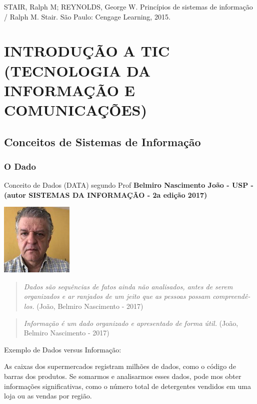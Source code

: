 \documentclass[
]{book}
\begin{document}
STAIR, Ralph M; REYNOLDS, George W. Princípios de sistemas de informação / Ralph M. Stair. São Paulo: Cengage Learning, 2015.

\chapter{INTRODUÇÃO A TIC (TECNOLOGIA DA INFORMAÇÃO E COMUNICAÇÕES)}\label{introduuxe7uxe3o-a-tic-tecnologia-da-informauxe7uxe3o-e-comunicauxe7uxf5es}

\section{Conceitos de Sistemas de Informação}\label{conceitos-de-sistemas-de-informauxe7uxe3o}

\subsection{O Dado}\label{o-dado}

Conceito de Dados (DATA) segundo Prof \textbf{Belmiro Nascimento João - USP - (autor SISTEMAS DA INFORMAÇÃO - 2a edição 2017)}

\includegraphics[width=1.36458in,height=\textheight]{images/belmiro_do_nascimento_joao-2.jpg}

\begin{quote}
\emph{Dados são sequências de fatos ainda não analisados, antes de serem organizados e ar­ ranjados de um jeito que as pessoas possam compreendê-los.} (João, Belmiro Nascimento - 2017)
\end{quote}

\begin{quote}
\emph{Informação é um dado organizado e apresentado de forma útil.} (João, Belmiro Nascimento - 2017)
\end{quote}

Exemplo de Dados versus Informação:

As caixas dos supermercados registram milhões de dados, como o código de barras dos produtos. Se somarmos e analisarmos esses dados, pode­ mos obter informações significativas, como o número total de detergentes vendidos em uma loja ou as vendas por região.
\end{document}
